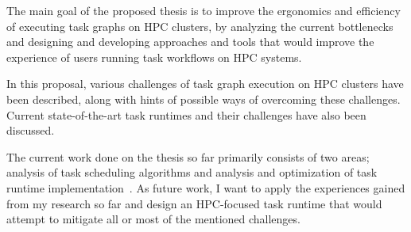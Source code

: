 The main goal of the proposed thesis is to improve the ergonomics and efficiency of executing
task graphs on HPC clusters, by analyzing the current bottlenecks and designing and developing
approaches and tools that would improve the experience of users running task workflows on HPC
systems.

In this proposal, various challenges of task graph execution on HPC clusters have been
described, along with hints of possible ways of overcoming these challenges. Current
state-of-the-art task runtimes and their challenges have also been discussed.

The current work done on the thesis so far primarily consists of two areas; analysis of task
scheduling algorithms and analysis and optimization of task runtime
implementation~\cite{estee,rsds}. As future work, I want to apply the experiences gained from my
research so far and design an HPC-focused task runtime that would attempt to mitigate all or
most of the mentioned challenges.
